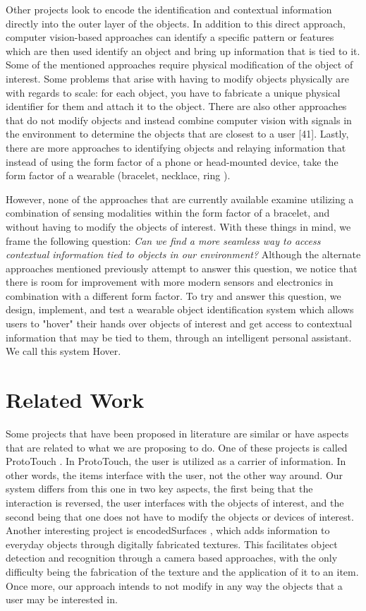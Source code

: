 Other projects look to encode the identification and contextual information directly into the outer layer of the objects. In addition to this direct approach, computer vision-based approaches can identify a specific pattern or features which are then used identify an object and bring up information that is tied to it. Some of the mentioned approaches require physical modification of the object of interest. Some problems that arise with having to modify objects physically are with regards to scale: for each object, you have to fabricate a unique physical identifier for them and attach it to the object. There are also other approaches that do not modify objects and instead combine computer vision with signals in the environment to determine the objects that are closest to a user [41]. Lastly, there are more approaches to identifying objects and relaying information that instead of using the form factor of a phone or head-mounted device, take the form factor of a wearable (bracelet, necklace\cite{mistry_maes_2009}, ring\cite{nanayakkara_shilkrot_maes_2012} \cite{shilkrot_huber_ee_maes_nanayakkara_2015}). 

However, none of the approaches that are currently available examine utilizing a combination of sensing modalities within the form factor of a bracelet, and without having to modify the objects of interest. With these things in mind, we frame the following question: \textit{Can we find a more seamless way to access contextual information tied to objects in our environment?} Although the alternate approaches mentioned previously attempt to answer this question, we notice that there is room for improvement with more modern sensors and electronics in combination with a different form factor.  To try and answer this question, we design, implement, and test a wearable object identification system which allows users to "hover" their hands over objects of interest and get access to contextual information that may be tied to them, through an intelligent personal assistant. We call this system Hover.  


\section{Related Work}
Some projects that have been proposed in literature are similar or have aspects that are related to what we are proposing to do.  One of these projects is called ProtoTouch \cite{cranor_2011}.  In ProtoTouch, the user is utilized as a carrier of information.  In other words, the items interface with the user, not the other way around.  Our system differs from this one in two key aspects, the first being that the interaction is reversed, the user interfaces with the objects of interest, and the second being that one does not have to modify the objects or devices of interest.  Another interesting project is encodedSurfaces \cite{rich_2013}, which adds information to everyday objects through digitally fabricated textures. This facilitates object detection and recognition through a camera based approaches, with the only difficulty being the fabrication of the texture and the application of it to an item.  Once more, our approach intends to not modify in any way the objects that a user may be interested in.  

